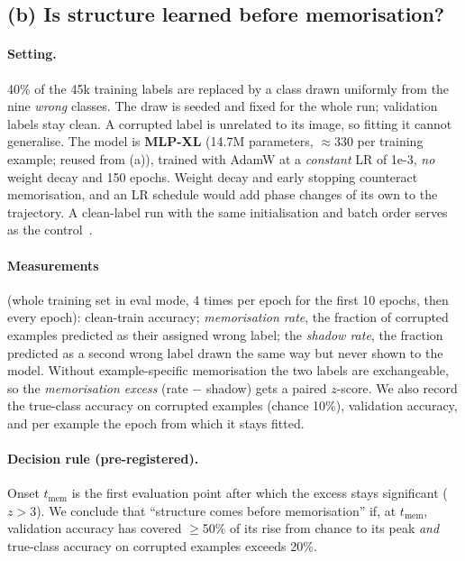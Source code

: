 
\subsection{(b) Is structure learned before memorisation?}

\paragraph{Setting.} 40\% of the 45k training labels are replaced by a class drawn uniformly from the nine \emph{wrong}
classes. The draw is seeded and fixed for the whole run; validation labels stay clean. A corrupted label is unrelated to its
image, so fitting it cannot generalise. The model is \textbf{MLP-XL} (14.7M parameters, $\approx$330 per training
example; reused from (a)), trained with AdamW at a \emph{constant} LR of 1e-3, \emph{no} weight decay and 150 epochs. Weight
decay and early stopping counteract memorisation, and an LR schedule would add phase changes of its own to the trajectory. A clean-label run with the
same initialisation and batch order serves as the control~\cite{zhang2017understanding,arpit2017closer}.

\paragraph{Measurements} (whole training set in eval mode, 4 times per epoch for the first 10 epochs, then every epoch):
clean-train accuracy; \emph{memorisation rate}, the fraction of corrupted examples predicted as their assigned wrong label;
the \emph{shadow rate}, the fraction predicted as a second wrong label drawn the same way but never shown to the model. Without
example-specific memorisation the two labels are exchangeable, so the \emph{memorisation excess} (rate $-$ shadow) gets a paired $z$-score. We also record
the true-class accuracy on corrupted examples (chance 10\%), validation accuracy, and per example the epoch from which it
stays fitted.

\paragraph{Decision rule (pre-registered).} Onset $t_\text{mem}$ is the first evaluation point after which the excess stays
significant ($z>3$). We conclude that ``structure comes before memorisation'' if, at $t_\text{mem}$, validation accuracy has
covered $\geq$50\% of its rise from chance to its peak \emph{and} true-class accuracy on corrupted examples exceeds 20\%.

